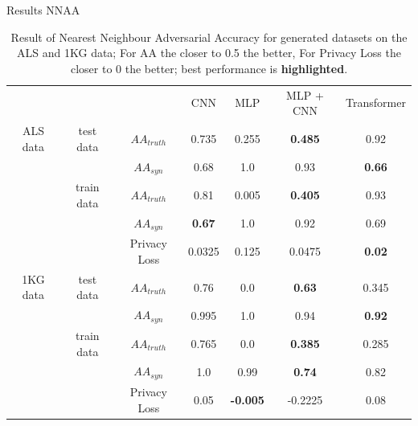 \documentclass[compress, aspectratio=169]{beamer}
\begin{document}
\begin{frame}{Results NNAA}
    \small
\begin{table}
  \centering
  \caption{Result of Nearest Neighbour Adversarial Accuracy for generated datasets on the ALS and 1KG data; For AA the closer to 0.5 the better, For Privacy Loss the closer to 0 the better; best performance is \textbf{highlighted}.}
  \label{Fig:nnaccals}
  \begin{tabular}{c c c | cccc}
    \toprule
& &  & CNN & MLP  & MLP + CNN & Transformer  \\

  \cmidrule(r){1-3}  \cmidrule(r){3-7} 
 ALS data &test data &  $AA_{truth}$ & 0.735 & 0.255  & \textbf{0.485} & 0.92 \\
& &  $AA_{syn}$&0.68 & 1.0  & 0.93 &   \textbf{0.66}  \\
  \cmidrule(r){2-3}  \cmidrule(r){3-7}
 & train data & $AA_{truth}$ & 0.81 & 0.005  & \textbf{0.405} & 0.93 \\
 & & $AA_{syn}$& \textbf{0.67} & 1.0  & 0.92 &  0.69  \\
  \cmidrule(r){2-3}  \cmidrule(r){3-7}
 & & Privacy Loss & 0.0325 & 0.125 & 0.0475 & \textbf{0.02} \\


  \cmidrule(r){1-3}  \cmidrule(r){3-7} 
1KG data  &test data &  $AA_{truth}$ & 0.76 & 0.0  & \textbf{0.63} & 0.345 \\
& &  $AA_{syn}$& 0.995 & 1.0  & 0.94 & \textbf{0.92}  \\
  \cmidrule(r){2-3}  \cmidrule(r){3-7}
& train data & $AA_{truth}$ & 0.765 & 0.0 & \textbf{0.385} & 0.285 \\
 & & $AA_{syn}$& 1.0 & 0.99  & \textbf{0.74} &  0.82 \\
  \cmidrule(r){2-3}  \cmidrule(r){3-7}
 & & Privacy Loss & 0.05 & \textbf{-0.005} & -0.2225 & 0.08 \\

    \bottomrule
  \end{tabular}
\end{table}
\end{frame}
\end{document}
